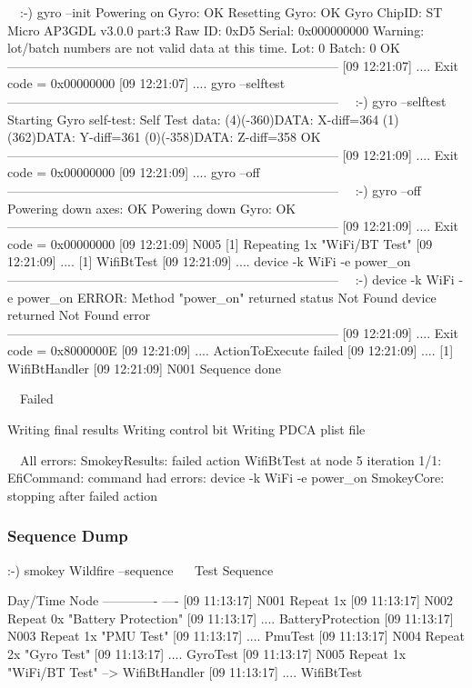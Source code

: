 \begin{AnnotedLogFile}
~~:-) gyro --init
Powering on Gyro: OK
Resetting Gyro: OK
Gyro ChipID: ST Micro AP3GDL v3.0.0 part:3
Raw ID: 0xD5
Serial: 0x000000000
Warning: lot/batch numbers are not valid data at this time.
Lot: 0 Batch: 0
OK
------------------------------------------------------------------------------
[09 12:21:07] .... 			Exit code = 0x00000000
[09 12:21:07] .... 			gyro --selftest
------------------------------------------------------------------------------
~~:-) gyro --selftest
Starting Gyro self-test:
Self Test data:
(4)(-360)DATA: X-diff=364
(1)(362)DATA: Y-diff=361
(0)(-358)DATA: Z-diff=358
OK
------------------------------------------------------------------------------
[09 12:21:09] .... 			Exit code = 0x00000000
[09 12:21:09] .... 			gyro --off
------------------------------------------------------------------------------
~~:-) gyro --off
Powering down axes: OK
Powering down Gyro: OK
------------------------------------------------------------------------------
[09 12:21:09] .... 			Exit code = 0x00000000
[09 12:21:09] N005 	[1] Repeating 1x "WiFi/BT Test"
[09 12:21:09] .... 		[1] WifiBtTest
[09 12:21:09] .... 			device -k WiFi -e power_on
------------------------------------------------------------------------------
~~:-) device -k WiFi -e power_on
ERROR: Method "power_on" returned status Not Found
device returned Not Found error
------------------------------------------------------------------------------
[09 12:21:09] .... 			Exit code = 0x8000000E
[09 12:21:09] .... 			ActionToExecute failed
[09 12:21:09] .... 		[1] WifiBtHandler
[09 12:21:09] N001 Sequence done

~~Failed

Writing final results
Writing control bit
Writing PDCA plist file

~~All errors:
	SmokeyResults: failed action WifiBtTest at node 5 iteration 1/1: EfiCommand: command had errors: device -k WiFi -e power_on
	SmokeyCore: stopping after failed action
\end{AnnotedLogFile}

\subsubsection{Sequence Dump}

\begin{LogExcerpt}
:-) smokey Wildfire --sequence
~\elide~
Test Sequence

Day/Time      Node
------------- ----
[09 11:13:17] N001 Repeat 1x
[09 11:13:17] N002      Repeat 0x "Battery Protection"
[09 11:13:17] ....              BatteryProtection
[09 11:13:17] N003      Repeat 1x "PMU Test"
[09 11:13:17] ....              PmuTest
[09 11:13:17] N004      Repeat 2x "Gyro Test"
[09 11:13:17] ....              GyroTest
[09 11:13:17] N005      Repeat 1x "WiFi/BT Test" --> WifiBtHandler
[09 11:13:17] ....              WifiBtTest
\end{LogExcerpt}

